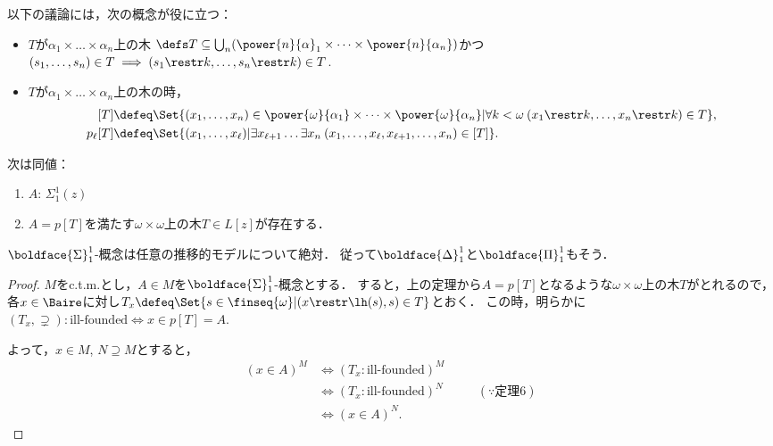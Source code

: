 \documentclass[xelatex,a4j,jadriver=standard]{bxjsarticle}
\begin{document}
以下の議論には，次の概念が役に立つ：

\begin{definition}
 \begin{itemize}
  \item $T$が$\alpha_1 \times \dots \times \alpha_n$上の木
        $\defs T \subseteq \bigcup_n (\power{n}{\alpha}_1 \times \dots \times \power{n}{\alpha_n})$かつ$(s_1, \dots, s_n) \in T \implies (s_1 \restr k, \dots, s_n \restr k) \in T$.
  \item $T$が$\alpha_1 \times \dots \times \alpha_n$上の木の時，
        \begin{align*}\phantom{}
         [T] &\defeq \Set{(x_1, \dots, x_n) \in \power{\omega}{\alpha_1} \times \dots \times \power{\omega}{\alpha_n} | \forall k < \omega \: (x_1 \restr k, \dots, x_n \restr k) \in T},\\
         p_\ell[T] &\defeq \Set{ (x_1, \dots, x_\ell) | \exists x_{\ell+1}\dots \exists x_{n}\: (x_1, \dots, x_{\ell}, x_{\ell+1}, \dots, x_n) \in [T] }.
        \end{align*}
 \end{itemize}
\end{definition}

\begin{theorem}
 次は同値：
 \begin{enumerate}
  \item $A$: $\Sigma^1_1(z)$
  \item $A = p[T]$を満たす$\omega\times\omega$上の木$T \in L[z]$が存在する．
 \end{enumerate}
\end{theorem}

\begin{theorem}
 $\boldface{\Sigma}^1_1$-概念は任意の推移的モデルについて絶対．
 従って$\boldface{\Delta}^1_1$と$\boldface{\Pi}^1_1$もそう．
\end{theorem}

\begin{proof}
 $M$をc.t.m.とし，$A \in M$を$\boldface{\Sigma}^1_1$-概念とする．
 すると，上の定理から$A = p[T]$となるような$\omega \times \omega$上の木$T$がとれるので，
 各$x \in \Baire$に対し$T_x \defeq \Set{s \in \finseq{\omega} | (x \restr \lh(s), s) \in T}$とおく．
 この時，明らかに$(T_x, \supsetneq): \text{ill-founded} \iff x \in p[T] = A$.
 
 よって，$x \in M$, $N \supseteq M$とすると，
 \begin{align*}
  (x \in A)^{M} &\iff (T_x: \text{ill-founded})^M\\
  &\iff (T_x: \text{ill-founded})^N &\quad& (\because \text{定理}6)\\
  &\iff (x \in A)^N.
 \end{align*}
\end{proof}
\end{document}
